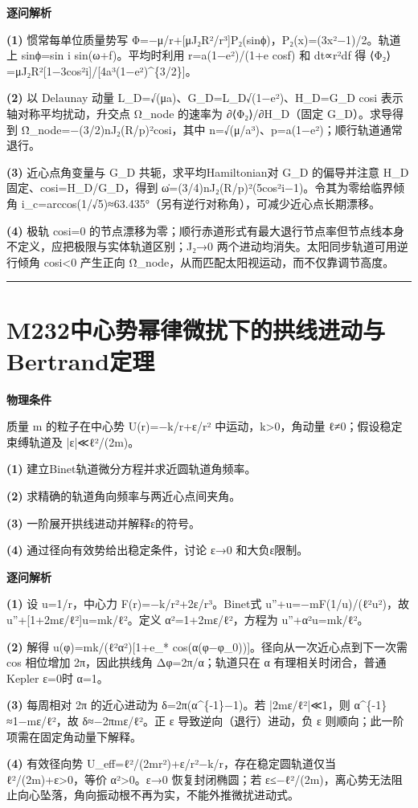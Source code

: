 \documentclass[UTF8,a4paper,11pt,oneside,openany]{ctexbook}
\begin{document}
\par\medskip\noindent\textbf{逐问解析}
\par\noindent\textbf{(1)} 惯常每单位质量势写 Φ=−μ/r+[μJ₂R²/r³]P₂(sinϕ)，P₂(x)=(3x²−1)/2。轨道上 sinϕ=sin i sin(ω+f)。平均时利用 r=a(1−e²)/(1+e cosf) 和 dt∝r²df 得 ⟨Φ₂⟩=μJ₂R²[1−3cos²i]/[4a³(1−e²)\textasciicircum{}\{3/2\}]。
\par\noindent\textbf{(2)} 以 Delaunay 动量 L\_D=√(μa)、G\_D=L\_D√(1−e²)、H\_D=G\_D cosi 表示轴对称平均扰动，升交点 Ω\_node 的速率为 ∂⟨Φ₂⟩/∂H\_D（固定 G\_D）。求导得到 Ω̇\_node=−(3/2)nJ₂(R/p)²cosi，其中 n=√(μ/a³)、p=a(1−e²)；顺行轨道通常退行。
\par\noindent\textbf{(3)} 近心点角变量与 G\_D 共轭，求平均Hamiltonian对 G\_D 的偏导并注意 H\_D 固定、cosi=H\_D/G\_D，得到 ω̇=(3/4)nJ₂(R/p)²(5cos²i−1)。令其为零给临界倾角 i\_c=arccos(1/√5)≈63.435°（另有逆行对称角），可减少近心点长期漂移。
\par\noindent\textbf{(4)} 极轨 cosi=0 的节点漂移为零；顺行赤道形式有最大退行节点率但节点线本身不定义，应把极限与实体轨道区别；J₂→0 两个进动均消失。太阳同步轨道可用逆行倾角 cosi<0 产生正向 Ω̇\_node，从而匹配太阳视运动，而不仅靠调节高度。

\par\bigskip\hrule\bigskip
\section*{M232\quad 中心势幂律微扰下的拱线进动与Bertrand定理}
\textbf{物理条件}\par 质量 m 的粒子在中心势 U(r)=−k/r+ε/r² 中运动，k>0，角动量 ℓ≠0；假设稳定束缚轨道及 |ε|≪ℓ²/(2m)。
\par\noindent\textbf{(1)} 建立Binet轨道微分方程并求近圆轨道角频率。
\par\noindent\textbf{(2)} 求精确的轨道角向频率与两近心点间夹角。
\par\noindent\textbf{(3)} 一阶展开拱线进动并解释ε的符号。
\par\noindent\textbf{(4)} 通过径向有效势给出稳定条件，讨论 ε→0 和大负ε限制。

\par\medskip\noindent\textbf{逐问解析}
\par\noindent\textbf{(1)} 设 u=1/r，中心力 F(r)=−k/r²+2ε/r³。Binet式 u''+u=−mF(1/u)/(ℓ²u²)，故 u''+[1+2mε/ℓ²]u=mk/ℓ²。定义 α²=1+2mε/ℓ²，方程为 u''+α²u=mk/ℓ²。
\par\noindent\textbf{(2)} 解得 u(φ)=mk/(ℓ²α²)[1+e\_* cos(α(φ−φ\_0))]。径向从一次近心点到下一次需 cos 相位增加 2π，因此拱线角 Δφ=2π/α；轨道只在 α 有理相关时闭合，普通Kepler ε=0时 α=1。
\par\noindent\textbf{(3)} 每周相对 2π 的近心进动为 δ=2π(α\textasciicircum{}\{-1\}−1)。若 |2mε/ℓ²|≪1，则 α\textasciicircum{}\{-1\}≈1−mε/ℓ²，故 δ≈−2πmε/ℓ²。正 ε 导致逆向（退行）进动，负 ε 则顺向；此一阶项需在固定角动量下解释。
\par\noindent\textbf{(4)} 有效径向势 U\_eff=ℓ²/(2mr²)+ε/r²−k/r，存在稳定圆轨道仅当 ℓ²/(2m)+ε>0，等价 α²>0。ε→0 恢复封闭椭圆；若 ε≤−ℓ²/(2m)，离心势无法阻止向心坠落，角向振动根不再为实，不能外推微扰进动式。
\end{document}
